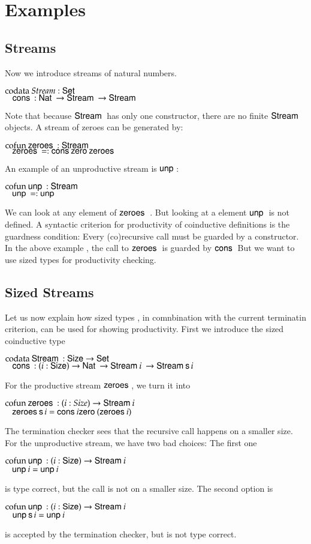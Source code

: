 \section{Examples}

\subsection{Streams}
Now we introduce streams of natural numbers.
\begin{bsp}
$\mathrm{codata}\: Stream : \mathsf{Set} $ \\
$\hspace*{3mm} \mathsf{cons}\: : \mathsf{Nat}\: \rightarrow \mathsf{Stream}\: \rightarrow \mathsf{Stream}\: $
\end{bsp}
Note that because $\mathsf{Stream}\:$ has only one constructor, there are no finite $\mathsf{Stream}\:$ objects.
A stream of zeroes can be generated by:
\begin{bsp}
$\mathrm{cofun}\: \mathsf{zeroes}\:: \mathsf{Stream}\: $ \\
$\hspace*{3mm} \mathsf{zeroes}\: = : \mathsf{cons}\: \mathsf{zero}\: \mathsf{zeroes}\:$
\end{bsp}

An example of an unproductive stream is $\mathsf{unp}\:$:
\begin{bsp}
$\mathrm{cofun}\: \mathsf{unp}\: : \mathsf{Stream}\: $ \\
$\hspace*{3mm} \mathsf{unp}\: = : \mathsf{unp}\:$
\end{bsp}
We can look at any element of $\mathsf{zeroes}\:$ .
But looking at a element $\mathsf{unp}\:$ is not defined. 
A syntactic criterion for productivity of coinductive definitions is the guardness condition:
Every (co)recursive call must be guarded by a constructor.
In the above example , the call to $\mathsf{zeroes}\:$ is guarded by $\mathsf{cons}\:$
But we want to use sized types for productivity checking.

\subsection{Sized Streams}
Let us now explain how sized types , in comnbination with the current terminatin criterion, can be used for showing productivity.
First we introduce the sized coinductive type 
\begin{bsp}
$\mathrm{codata}\: \mathsf{Stream}\: : \mathsf{Size} \rightarrow \mathsf{Set} $ \\
$\hspace*{3mm} \mathsf{cons}\: : ( i : \mathsf{Size} ) \rightarrow{\mathsf{Nat}\:\rightarrow\mathsf{Stream}\:i \: \rightarrow\mathsf{Stream}\:\mathsf{s}\,i } $
\end{bsp}
For the productive stream $\mathsf{zeroes}\:$, we turn it into
\begin{bsp}
$\mathrm{cofun}\: \mathsf{zeroes}\:: ( i : Size ) \rightarrow{\mathsf{Stream}\:i} $ \\
$\hspace*{3mm} \mathsf{zeroes}\: \mathsf{s}\, i = \mathsf{cons}\: i \mathsf{zero}\: (\mathsf{zeroes}\: i)$\\
\end{bsp}
The termination checker sees that the recursive call happens on a smaller size.
For the unproductive stream, we have two bad choices:
The first one
\begin{bsp}
$\mathrm{cofun}\: \mathsf{unp}\: : ( i : \mathsf{Size} ) \rightarrow{\mathsf{Stream}\:i}$ \\
$\hspace*{3mm} \mathsf{unp}\: i =  \mathsf{unp}\: i$
\end{bsp}
is type correct, but the call is not on a smaller size.
The second option is
\begin{bsp}
$\mathrm{cofun}\: \mathsf{unp}\: : ( i : \mathsf{Size} ) \rightarrow{\mathsf{Stream}\:i}$ \\
$\hspace*{3mm} \mathsf{unp}\: \mathsf{s}\, i = \mathsf{unp}\: i $
\end{bsp}
is accepted by the termination checker, but is not type correct.

